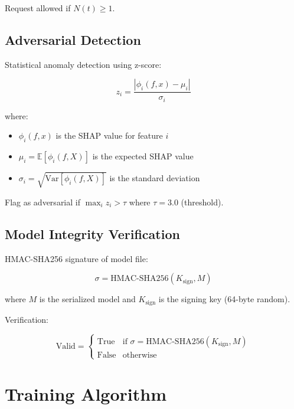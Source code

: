 \documentclass[12pt,a4paper]{article}
\begin{document}
Request allowed if $N(t) \geq 1$.

\subsection{Adversarial Detection}

Statistical anomaly detection using z-score:

$$z_i = \frac{|\phi_i(f, x) - \mu_i|}{\sigma_i}$$

where:
\begin{itemize}
    \item $\phi_i(f, x)$ is the SHAP value for feature $i$
    \item $\mu_i = \mathbb{E}[\phi_i(f, X)]$ is the expected SHAP value
    \item $\sigma_i = \sqrt{\text{Var}[\phi_i(f, X)]}$ is the standard deviation
\end{itemize}

Flag as adversarial if $\max_i z_i > \tau$ where $\tau = 3.0$ (threshold).

\subsection{Model Integrity Verification}

HMAC-SHA256 signature of model file:

$$\sigma = \text{HMAC-SHA256}(K_{\text{sign}}, M)$$

where $M$ is the serialized model and $K_{\text{sign}}$ is the signing key (64-byte random).

Verification:

$$\text{Valid} = \begin{cases}
\text{True} & \text{if } \sigma = \text{HMAC-SHA256}(K_{\text{sign}}, M) \\
\text{False} & \text{otherwise}
\end{cases}$$

\section{Training Algorithm}
\end{document}
